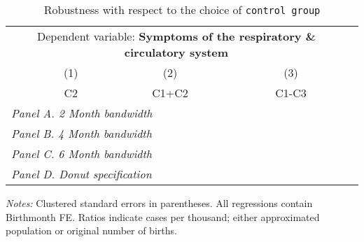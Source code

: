 \begin{table}[H] \begin{threeparttable} \centering \caption{Robustness with respect to the choice of \texttt{control group}} {\def\sym#1{\ifmmode^{#1}\else\(^{#1}\)\fi} \begin{tabular}{l*{4}{c}} \toprule \multicolumn{4}{c}{Dependent variable: \textbf{Symptoms of the respiratory \& circulatory system}} \\ \cmidrule(lr){2-4}
            &\multicolumn{1}{c}{(1)}&\multicolumn{1}{c}{(2)}&\multicolumn{1}{c}{(3)}\\
            &\multicolumn{1}{c}{C2}&\multicolumn{1}{c}{C1+C2}&\multicolumn{1}{c}{C1-C3}\\
\midrule
 \multicolumn{4}{l}{\emph{Panel A. 2 Month bandwidth}} \\    \midrule\multicolumn{4}{l}{\emph{Panel B. 4 Month bandwidth}} \\    \midrule\multicolumn{4}{l}{\emph{Panel C. 6 Month bandwidth}} \\    \midrule\multicolumn{4}{l}{\emph{Panel D. Donut specification}} \\    
\bottomrule \end{tabular} } \begin{tablenotes} \item \scriptsize \emph{Notes:} Clustered standard errors in parentheses. All regressions contain Birthmonth FE. Ratios indicate cases per thousand; either approximated population or original number of births. \end{tablenotes} \end{threeparttable} \end{table} 
